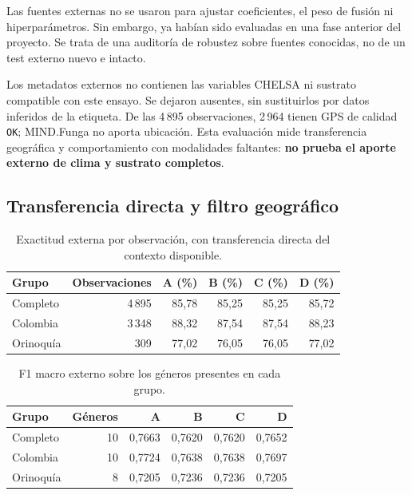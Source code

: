 \documentclass[11pt,a4paper]{article}
\begin{document}
Las fuentes externas no se usaron para ajustar coeficientes, el peso de fusión
ni hiperparámetros. Sin embargo, ya habían sido evaluadas en una fase anterior
del proyecto. Se trata de una auditoría de robustez sobre fuentes conocidas,
no de un test externo nuevo e intacto.

Los metadatos externos no contienen las variables CHELSA ni sustrato compatible
con este ensayo. Se dejaron ausentes, sin sustituirlos por datos inferidos de
la etiqueta. De las 4\,895 observaciones, 2\,964 tienen GPS de calidad
\texttt{OK}; MIND.Funga no aporta ubicación. Esta evaluación mide transferencia
geográfica y comportamiento con modalidades faltantes: \textbf{no prueba el
aporte externo de clima y sustrato completos}.

\subsection{Transferencia directa y filtro geográfico}
\begin{table}[H]
\centering
\caption{Exactitud externa por observación, con transferencia directa del contexto disponible.}
\label{tab:external}
\begin{tabular}{lrrrrr}
\toprule
Grupo & Observaciones & A (\%) & B (\%) & C (\%) & D (\%) \\
\midrule
Completo & 4\,895 & 85,78 & 85,25 & 85,25 & 85,72 \\
Colombia & 3\,348 & 88,32 & 87,54 & 87,54 & 88,23 \\
Orinoquía & 309 & 77,02 & 76,05 & 76,05 & 77,02 \\
\bottomrule
\end{tabular}
\end{table}

\begin{table}[H]
\centering
\caption{F1 macro externo sobre los géneros presentes en cada grupo.}
\label{tab:external-f1}
\begin{tabular}{lrrrrr}
\toprule
Grupo & Géneros & A & B & C & D \\
\midrule
Completo & 10 & 0,7663 & 0,7620 & 0,7620 & 0,7652 \\
Colombia & 10 & 0,7724 & 0,7638 & 0,7638 & 0,7697 \\
Orinoquía & 8 & 0,7205 & 0,7236 & 0,7236 & 0,7205 \\
\bottomrule
\end{tabular}
\par{}
\end{table}
\end{document}
